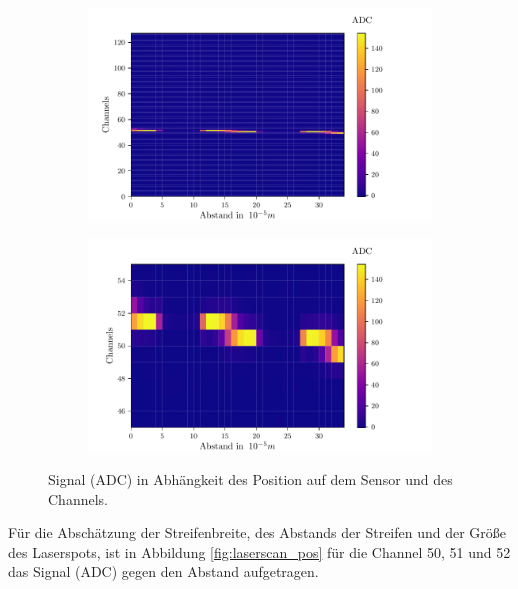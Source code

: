 \begin{figure}[H]
\centering
\begin{subfigure}{.5\textwidth}
	\centering
	\includegraphics[width=1.05\textwidth]{build/Laserscan_komplett.pdf}
	\caption{}
	\label{fig:laserscan_komplett}
\end{subfigure}%
\begin{subfigure}{.5\textwidth}
	\centering
	\includegraphics[width=1.05\textwidth]{build/Laserscan_zoom.pdf}
	\caption{}
	\label{fig:laserscan_zoom}
\end{subfigure}
\caption{Signal (ADC) in Abhängkeit des Position auf dem Sensor und des Channels.}
\label{fig:ladserscan}
\end{figure}

Für die Abschätzung der Streifenbreite, des Abstands der Streifen und der Größe des Laserspots, ist in Abbildung \ref{fig:laserscan_pos} für die Channel 50, 51 und 52 das Signal (ADC) gegen den Abstand aufgetragen.

